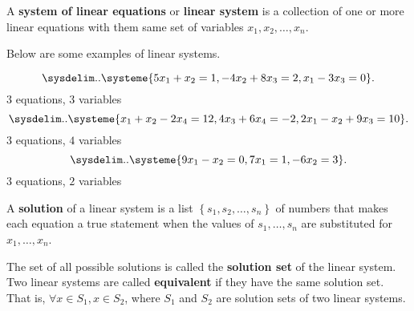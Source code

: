 \begin{definition}
  \label{def:system_of_linear_equations}

  A \textbf{system of linear equations} or \textbf{linear system} is a
  collection of one or more linear equations with them same set of variables
  $x_1, x_2, \dots, x_n$.
\end{definition}

\begin{example}
  \label{exm:system_of_linear_equations}

  Below are some examples of linear systems.

  \begin{multicols}{3}\noindent\centering
    \[%
      \sysdelim..\systeme{
        5x_1 + x_2 = 1,
        -4x_2 + 8x_3 = 2,
        x_1 - 3x_3 = 0
      }
    .\]%
    $3$ equations, $3$ variables\columnbreak
    \columnbreak
    \[%
      \sysdelim..\systeme{
        x_1 + x_2 - 2x_4 = 12,
        4x_3 + 6x_4 = -2,
        2x_1 - x_2 + 9x_3 = 10
      }
    .\]%
    $3$ equations, $4$ variables\columnbreak
    \[%
      \sysdelim..\systeme{
        9x_1 - x_2 = 0,
        7x_1 = 1,
        -6x_2 = 3
      }
    .\]%
    $3$ equations, $2$ variables
  \end{multicols}
\end{example}

\begin{definition}
  \label{def:solution_of_linear_system}

  A \textbf{solution} of a linear system is a list $\left\{s_1, s_2, \dots,
  s_n\right\}$ of numbers that makes each equation a true statement when the
  values of $s_1, \dots, s_n$ are substituted for $x_1, \dots, x_n$.

  The set of all possible solutions is called the \textbf{solution set} of the
  linear system. Two linear systems are called \textbf{equivalent} if they have
  the same solution set. That is, $\forall x \in S_1, x \in S_2$, where $S_1$
  and $S_2$ are solution sets of two linear systems.
\end{definition}

